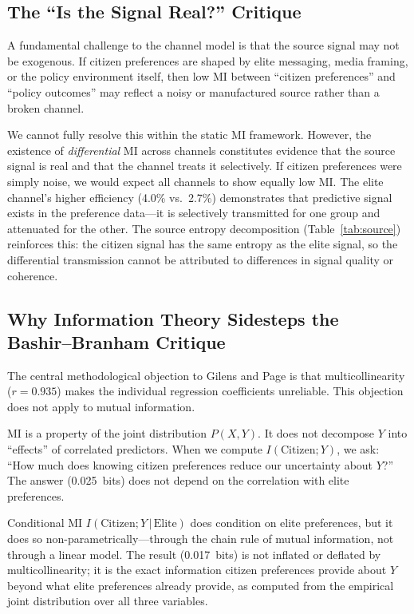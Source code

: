 \documentclass[twocolumn,10pt]{article}
\begin{document}
\subsection{The ``Is the Signal Real?'' Critique}

A fundamental challenge to the channel model is that the source signal may not be exogenous.  If citizen preferences are shaped by elite messaging, media framing, or the policy environment itself, then low MI between ``citizen preferences'' and ``policy outcomes'' may reflect a noisy or manufactured source rather than a broken channel.

We cannot fully resolve this within the static MI framework.  However, the existence of \emph{differential} MI across channels constitutes evidence that the source signal is real and that the channel treats it selectively.  If citizen preferences were simply noise, we would expect all channels to show equally low MI.  The elite channel's higher efficiency (4.0\% vs.\ 2.7\%) demonstrates that predictive signal exists in the preference data---it is selectively transmitted for one group and attenuated for the other.  The source entropy decomposition (Table~\ref{tab:source}) reinforces this: the citizen signal has the same entropy as the elite signal, so the differential transmission cannot be attributed to differences in signal quality or coherence.

\subsection{Why Information Theory Sidesteps the Bashir--Branham Critique}

The central methodological objection to Gilens and Page is that multicollinearity ($r = 0.935$) makes the individual regression coefficients unreliable.  This objection does not apply to mutual information.

MI is a property of the joint distribution $P(X,Y)$.  It does not decompose $Y$ into ``effects'' of correlated predictors.  When we compute $I(\text{Citizen}; Y)$, we ask: ``How much does knowing citizen preferences reduce our uncertainty about $Y$?''  The answer (0.025~bits) does not depend on the correlation with elite preferences.

Conditional MI $I(\text{Citizen}; Y \,|\, \text{Elite})$ does condition on elite preferences, but it does so non-parametrically---through the chain rule of mutual information, not through a linear model.  The result (0.017~bits) is not inflated or deflated by multicollinearity; it is the exact information citizen preferences provide about $Y$ beyond what elite preferences already provide, as computed from the empirical joint distribution over all three variables.
\end{document}
